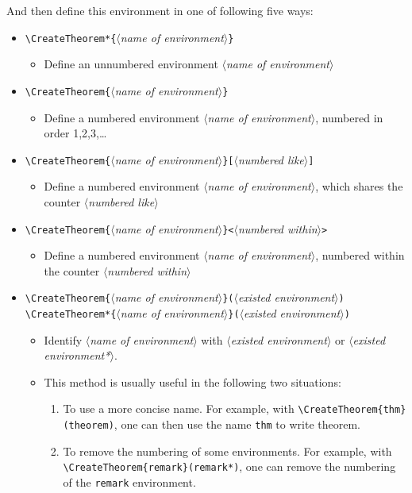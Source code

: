 \documentclass[allowbf]{lebhart}
\providecommand{\meta}[1]{$\langle${\normalfont\itshape#1}$\rangle$}
\begin{document}
\medskip
And then define this environment in one of following five ways:
\begin{itemize}
    \item \lstinline|\CreateTheorem*{|\meta{name of environment}\lstinline|}|
        \begin{itemize}
            \item Define an unnumbered environment \meta{name of environment}
        \end{itemize}
    \item \lstinline|\CreateTheorem{|\meta{name of environment}\lstinline|}|
        \begin{itemize}
            \item Define a numbered environment \meta{name of environment}, numbered in order 1,2,3,\dots
        \end{itemize}
    \item \lstinline|\CreateTheorem{|\meta{name of environment}\lstinline|}[|\meta{numbered like}\lstinline|]|
        \begin{itemize}
            \item Define a numbered environment \meta{name of environment}, which shares the counter \meta{numbered like}
        \end{itemize}
    \item \lstinline|\CreateTheorem{|\meta{name of environment}\lstinline|}<|\meta{numbered within}\lstinline|>|
        \begin{itemize}
            \item Define a numbered environment \meta{name of environment}, numbered within the counter \meta{numbered within}
        \end{itemize}
    \item \lstinline|\CreateTheorem{|\meta{name of environment}\lstinline|}(|\meta{existed environment}\lstinline|)|\\
    \lstinline|\CreateTheorem*{|\meta{name of environment}\lstinline|}(|\meta{existed environment}\lstinline|)|
        \begin{itemize}
            \item Identify \meta{name of environment} with \meta{existed environment} or \meta{existed environment*}.
            \item This method is usually useful in the following two situations:
                \begin{enumerate}
                    \item To use a more concise name. For example, with \lstinline|\CreateTheorem{thm}(theorem)|, one can then use the name \texttt{thm} to write theorem.
                    \item To remove the numbering of some environments. For example, with \lstinline|\CreateTheorem{remark}(remark*)|, one can remove the numbering of the \texttt{remark} environment.
                \end{enumerate}
        \end{itemize}
\end{itemize}
\end{document}
